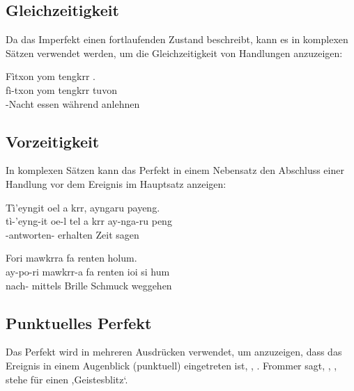 \subsection{Gleichzeitigkeit} Da das Imperfekt einen fortlaufenden Zustand beschreibt, kann es in komplexen Sätzen verwendet werden, um die Gleichzeitigkeit von Handlungen anzuzeigen:

\begin{interlin}
	\glll \Npawl{}Fìtxon yom tengkrr . \\
	fì-txon yom tengkrr tuvon \\
	-Nacht essen während anlehnen \\
\end{interlin}

\subsection{Vorzeitigkeit} In komplexen Sätzen kann das Perfekt in einem Nebensatz den Abschluss einer Handlung vor dem Ereignis im Hauptsatz anzeigen:

\begin{interlin}
	\glll \Npawl{}Tì'eyngit oel  a krr, ayngaru payeng. \\
	tì-'eyng-it oe-l tel a krr ay-nga-ru peng \\
	-antworten-  erhalten  Zeit  sagen \\
\end{interlin}

\begin{interlin}
	\glll \Npawl{}Fori mawkrra fa renten   holum. \\
	ay-po-ri mawkrr-a fa renten ioi si hum \\
	 nach- mittels Brille Schmuck  weggehen \\
\end{interlin}

\subsection{Punktuelles Perfekt} Das Perfekt wird in mehreren Ausdrücken verwendet, um anzuzeigen, dass das Ereignis in einem Augenblick (punktuell) eingetreten ist,  ,  . Frommer sagt, , , stehe für einen ,Geistesblitz‘.

